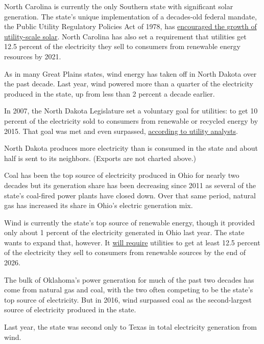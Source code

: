 North Carolina is currently the only Southern state with significant
solar generation. The state's unique implementation of a decades-old
federal mandate, the Public Utility Regulatory Policies Act of 1978, has
\href{https://www.eia.gov/todayinenergy/detail.php?id=27632}{encouraged
the growth of utility-scale solar}. North Carolina has also set a
requirement that utilities get 12.5 percent of the electricity they sell
to consumers from renewable energy resources by 2021.

As in many Great Plains states, wind energy has taken off in North
Dakota over the past decade. Last year, wind powered more than a quarter
of the electricity produced in the state, up from less than 2 percent a
decade earlier.

In 2007, the North Dakota Legislature set a voluntary goal for
utilities: to get 10 percent of the electricity sold to consumers from
renewable or recycled energy by 2015. That goal was met and even
surpassed,
\href{https://bismarcktribune.com/news/state-and-regional/low-cost-of-electricity-in-nd-discouraging-solar-energy-investments/article_ff5184db-d4fd-51c1-b91b-6dbc0e5d3d0c.html}{according
to utility analysts}.

North Dakota produces more electricity than is consumed in the state and
about half is sent to its neighbors. (Exports are not charted above.)

Coal has been the top source of electricity produced in Ohio for nearly
two decades but its generation share has been decreasing since 2011 as
several of the state's coal-fired power plants have closed down. Over
that same period, natural gas has increased its share in Ohio's electric
generation mix.

Wind is currently the state's top source of renewable energy, though it
provided only about 1 percent of the electricity generated in Ohio last
year. The state wants to expand that, however. It
\href{http://programs.dsireusa.org/system/program/detail/2934}{will
require} utilities to get at least 12.5 percent of the electricity they
sell to consumers from renewable sources by the end of 2026.

The bulk of Oklahoma's power generation for much of the past two decades
has come from natural gas and coal, with the two often competing to be
the state's top source of electricity. But in 2016, wind surpassed coal
as the second-largest source of electricity produced in the state.

Last year, the state was second only to Texas in total electricity
generation from wind.

